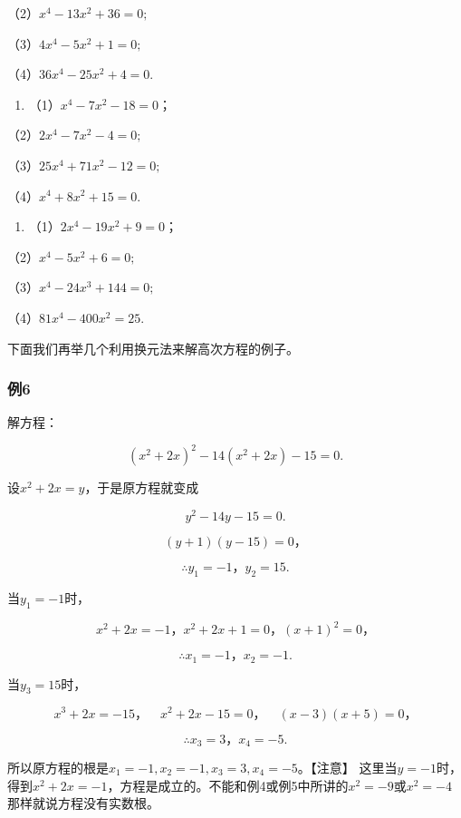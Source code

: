（2）\(x^{4} - 13x^{2} + 36 = 0;\)

（3）\(4x^{4} - 5x^{2} + 1 = 0;\)

（4）\(36x^{4} - 25x^{2} + 4 = 0.\)

\begin{enumerate}[start=2]
\item
  （1）\(x^{4} - 7x^{2} - 18 = 0\)；
\end{enumerate}

（2）\(2x^{4} - 7x^{2} - 4 = 0;\)

（3）\(25x^{4} + 71x^{2} - 12 = 0;\)

（4）\(x^{4} + 8x^{2} + 15 = 0.\)

\begin{enumerate}[start=3]
\item
  （1）\(2x^{4} - 19x^{2} + 9 = 0\)；
\end{enumerate}

（2）\(x^{4} - 5x^{2} + 6 = 0;\)

（3）\(x^{4} - 24x^{3} + 144 = 0;\)

（4）\(81x^{4} - 400x^{2} = 25.\)

下面我们再举几个利用换元法来解高次方程的例子。

\subsubsection{例6}

解方程：

\[
(x ^ {2} + 2 x) ^ {2} - 14 (x ^ {2} + 2 x) - 15 = 0.
\]

 设\(x^{2} + 2x = y\)，于是原方程就变成

\[
y ^ {2} - 14 y - 15 = 0.
\]

\[
(y + 1) (y - 15) = 0\text{，}
\]

\[
\therefore y _ {1} = - 1\text{，} y _ {2} = 15.
\]

当\(y_{1} = -1\)时，

\[
x ^ {2} + 2 x = - 1\text{，} x ^ {2} + 2 x + 1 = 0\text{，} (x + 1) ^ {2} = 0\text{，}
\]

\[
\therefore x _ {1} = - 1\text{，} x _ {2} = - 1.
\]

当\(y_{3} = 15\)时，

\[
x ^ {3} + 2 x = - 15\text{，} \quad x ^ {2} + 2 x - 15 = 0\text{，} \quad (x - 3) (x + 5) = 0\text{，}
\]

\[
\therefore x _ {3} = 3\text{，} x _ {4} = - 5.
\]

所以原方程的根是\(x_{1} = -1, x_{2} = -1, x_{3} = 3, x_{4} = -5\)。【注意】
这里当\(y = -1\)时，得到\(x^{2} + 2x = -1\)，方程是成立的。不能和例4或例5中所讲的\(x^{2} = -9\)或\(x^{2} = -4\)那样就说方程没有实数根。

